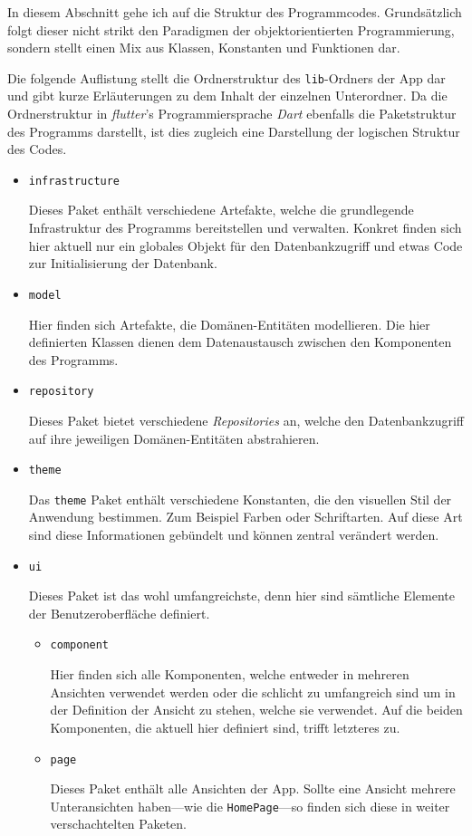 In diesem Abschnitt gehe ich auf die Struktur des Programmcodes.
Grundsätzlich folgt dieser nicht strikt den Paradigmen der objektorientierten Programmierung, sondern stellt einen Mix aus Klassen, Konstanten und Funktionen dar.

Die folgende Auflistung stellt die Ordnerstruktur des \texttt{lib}-Ordners der App dar und gibt kurze Erläuterungen zu dem Inhalt der einzelnen Unterordner.
Da die Ordnerstruktur in \emph{flutter}'s Programmiersprache \emph{Dart} ebenfalls die Paketstruktur des Programms darstellt, ist dies zugleich eine Darstellung der logischen Struktur des Codes.

 \begin{itemize}
   \item \texttt{infrastructure}
   
    Dieses Paket enthält verschiedene Artefakte, welche die grundlegende Infrastruktur des Programms bereitstellen und verwalten.
    Konkret finden sich hier aktuell nur ein globales Objekt für den Datenbankzugriff und etwas Code zur Initialisierung der Datenbank.

   \item \texttt{model}
   
    Hier finden sich Artefakte, die Domänen-Entitäten modellieren.
    Die hier definierten Klassen dienen dem Datenaustausch zwischen den Komponenten des Programms.

   \item \texttt{repository}
   
    Dieses Paket bietet verschiedene \emph{Repositories} an, welche den Datenbankzugriff auf ihre jeweiligen Domänen-Entitäten abstrahieren.

   \item \texttt{theme}
   
    Das \texttt{theme} Paket enthält verschiedene Konstanten, die den visuellen Stil der Anwendung bestimmen.
    Zum Beispiel Farben oder Schriftarten.
    Auf diese Art sind diese Informationen gebündelt und können zentral verändert werden.

   \item \texttt{ui}
   
    Dieses Paket ist das wohl umfangreichste, denn hier sind sämtliche Elemente der Benutzeroberfläche definiert.
   
   \begin{itemize}
     \item \texttt{component}
     
      Hier finden sich alle Komponenten, welche entweder in mehreren Ansichten verwendet werden oder die schlicht zu umfangreich sind um in der Definition der Ansicht zu stehen, welche sie verwendet.
      Auf die beiden Komponenten, die aktuell hier definiert sind, trifft letzteres zu. 

     \item \texttt{page}
     
     Dieses Paket enthält alle Ansichten der App.
     Sollte eine Ansicht mehrere Unteransichten haben---wie die \texttt{HomePage}---so finden sich diese in weiter verschachtelten Paketen.
   \end{itemize}
 \end{itemize}

